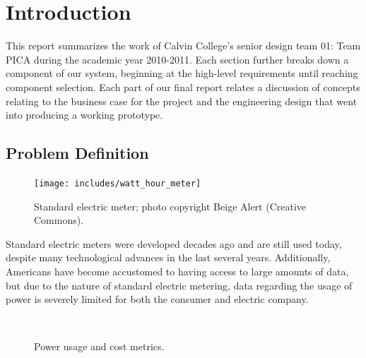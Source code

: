 \section{Introduction}
This report summarizes the work of Calvin College's senior design team 01: Team PICA during the academic year 2010-2011. Each section further breaks down a component of our system, beginning at the high-level requirements until reaching component selection. Each part of our final report relates a discussion of concepts relating to the business case for the project and the engineering design that went into producing a working prototype.

\subsection{Problem Definition}

\begin{figure}[htbp]
  \centering
  \texttt{[image: includes/watt\_hour\_meter]}
  \caption{Standard electric meter; photo copyright Beige Alert (Creative Commons).}
  \label{fig:mechanical_meter}
\end{figure}

Standard electric meters were developed decades ago and are still used today, despite many technological advances in the last several years. Additionally, Americans have become accustomed to having access to large amounts of data, but due to the nature of standard electric metering, data regarding the usage of power is severely limited for both the consumer and electric company. 

\begin{figure}[htbp]
  \centering
  \ 
  \caption{Power usage and cost metrics.}
  \label{fig:power_usage_and_cost}
\end{figure}


